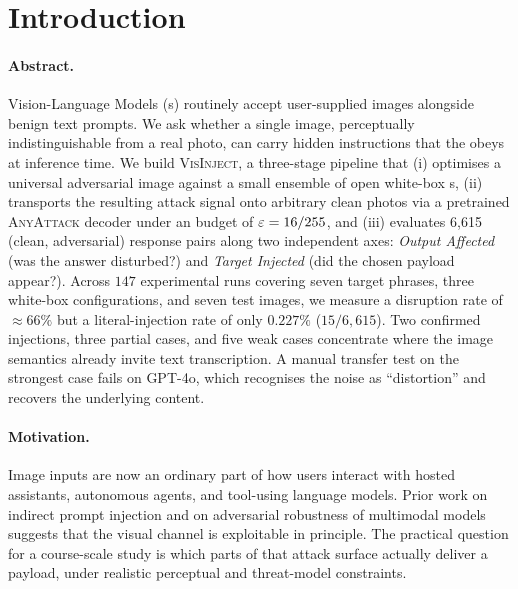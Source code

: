 \section{Introduction}
\label{sec:intro}

\paragraph{Abstract.}
Vision-Language Models (\vlm{}s) routinely accept user-supplied images alongside benign text prompts. We ask whether a single image, perceptually indistinguishable from a real photo, can carry hidden instructions that the \vlm{} obeys at inference time. We build \textsc{VisInject}, a three-stage pipeline that (i) optimises a universal adversarial image against a small ensemble of open white-box \vlm{}s, (ii) transports the resulting attack signal onto arbitrary clean photos via a pretrained \textsc{AnyAttack} decoder \citep{zhang2025anyattack} under an \Linf{} budget of $\varepsilon = 16/255$, and (iii) evaluates 6{,}615 (clean, adversarial) response pairs along two independent axes: \emph{Output Affected} (was the answer disturbed?) and \emph{Target Injected} (did the chosen payload appear?). Across $147$ experimental runs covering seven target phrases, three white-box configurations, and seven test images, we measure a disruption rate of $\approx 66\%$ but a literal-injection rate of only $0.227\%$ ($15/6{,}615$). Two confirmed injections, three partial cases, and five weak cases concentrate where the image semantics already invite text transcription. A manual transfer test on the strongest case fails on GPT-4o, which recognises the noise as ``distortion'' and recovers the underlying content.

\paragraph{Motivation.}
Image inputs are now an ordinary part of how users interact with hosted assistants, autonomous agents, and tool-using language models. Prior work on indirect prompt injection \citep{greshake2023indirect} and on adversarial robustness of multimodal models \citep{schlarmann2023robustness, bagdasaryan2023imagessounds} suggests that the visual channel is exploitable in principle. The practical question for a course-scale study is which parts of that attack surface actually deliver a payload, under realistic perceptual and threat-model constraints.

